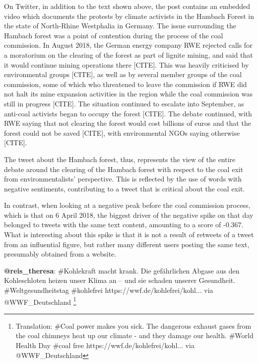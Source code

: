 \documentclass[12pt,onecolumn,twoside]{layout}
\begin{document}
On Twitter, in addition to the text shown above, the post contains an embedded video which documents the protests by climate activists in the Hambach Forest in the state of North-Rhine Westphalia in Germany. The issue surrounding the Hambach forest was a point of contention during the process of the coal commission. In August 2018, the German energy company RWE rejected calls for a moratorium on the clearing of the forest as part of lignite mining, and said that it would continue mining operations there [CITE]. This was heavily criticised by environmental groups [CITE], as well as by several member groups of the coal commission, some of which who threatened to leave the commission if RWE did not halt its mine expansion activities in the region while the coal commission was still in progress [CITE]. The situation continued to escalate into September, as anti-coal activists began to occupy the forest [CITE]. The debate continued, with RWE saying that not clearing the forest would cost billions of euros and that the forest could not be saved [CITE], with environmental NGOs saying otherwise [CITE].

The tweet about the Hambach forest, thus, represents the view of the entire debate around the clearing of the Hambach forest with respect to the coal exit from environmentalists' perspective. This is reflected by the use of words with negative sentiments, contributing to a tweet that is critical about the coal exit. 

In contrast, when looking at a negative peak before the coal commission process, which is that on 6 April 2018, the biggest driver of the negative spike on that day belonged to tweets with the same text content, amounting to a score of -0.367. What is interesting about this spike is that it is not a result of retweets of a tweet from an influential figure, but rather many different users posting the same text, presumably obtained from a website. 

\begin{displayquote}
	\textbf{@reis\_theresa}: \#Kohlekraft macht krank. Die gefährlichen Abgase aus den Kohleschloten heizen unser Klima an – und sie schaden unserer Gesundheit. \#Weltgesundheitstag \#kohlefrei https://wwf.de/kohlefrei/kohl... via @WWF\_Deutschland
	\footnote{Translation: \#Coal power makes you sick. The dangerous exhaust gases from the coal chimneys heat up our climate - and they damage our health. \#World Health Day \#coal free https://wwf.de/kohlefrei/kohl... via @WWF\_Deutschland}
\end{displayquote}
\end{document}
